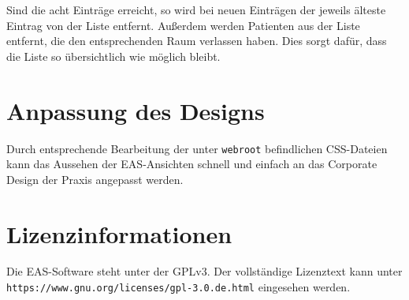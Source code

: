 \documentclass[a4paper,10pt]{scrreprt}
\begin{document}
Sind die acht Einträge erreicht, so wird bei neuen Einträgen der jeweils älteste Eintrag von der Liste entfernt. Außerdem werden Patienten aus der Liste entfernt, die den entsprechenden Raum verlassen haben. Dies sorgt dafür, dass die Liste so übersichtlich wie möglich bleibt.

\chapter{Anpassung des Designs}
Durch entsprechende Bearbeitung der unter \texttt{webroot} befindlichen CSS-Dateien kann das Aussehen der EAS-Ansichten schnell und einfach an das Corporate Design der Praxis angepasst werden.

\appendix
\chapter{Lizenzinformationen}
Die EAS-Software steht unter der GPLv3. Der vollständige Lizenztext kann unter \texttt{https://www.gnu.org/licenses/gpl-3.0.de.html} eingesehen werden.
\end{document}
